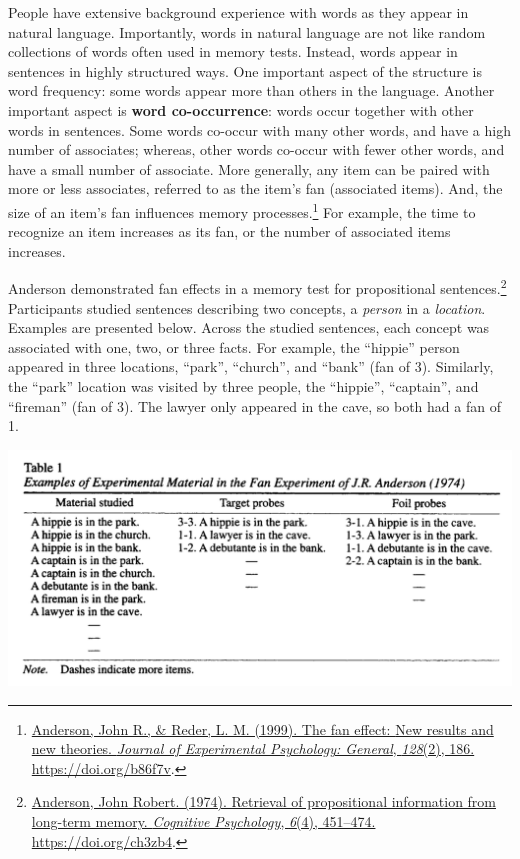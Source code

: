 \documentclass[
  oneside,
  12pt]{crumpbook}
\begin{document}
People have extensive background experience with words as they appear in natural language. Importantly, words in natural language are not like random collections of words often used in memory tests. Instead, words appear in sentences in highly structured ways. One important aspect of the structure is word frequency: some words appear more than others in the language. Another important aspect is \textbf{word co-occurrence}: words occur together with other words in sentences. Some words co-occur with many other words, and have a high number of associates; whereas, other words co-occur with fewer other words, and have a small number of associate. More generally, any item can be paired with more or less associates, referred to as the item's fan (associated items). And, the size of an item's fan influences memory processes.\footnote{\protect\hyperlink{ref-andersonFanEffectNew1999}{Anderson, John R., \& Reder, L. M. (1999). The fan effect: {New} results and new theories. \emph{Journal of Experimental Psychology: General}, \emph{128}(2), 186. \url{https://doi.org/b86f7v}}.} For example, the time to recognize an item increases as its fan, or the number of associated items increases.

Anderson demonstrated fan effects in a memory test for propositional sentences.\footnote{\protect\hyperlink{ref-andersonRetrievalPropositionalInformation1974}{Anderson, John Robert. (1974). Retrieval of propositional information from long-term memory. \emph{Cognitive Psychology}, \emph{6}(4), 451--474. \url{https://doi.org/ch3zb4}}.} Participants studied sentences describing two concepts, a \emph{person} in a \emph{location}. Examples are presented below. Across the studied sentences, each concept was associated with one, two, or three facts. For example, the ``hippie'' person appeared in three locations, ``park'', ``church'', and ``bank'' (fan of 3). Similarly, the ``park'' location was visited by three people, the ``hippie'', ``captain'', and ``fireman'' (fan of 3). The lawyer only appeared in the cave, so both had a fan of 1.

\begin{center}\includegraphics[width=1\linewidth]{imgs/Fan_effect} \end{center}
\end{document}
